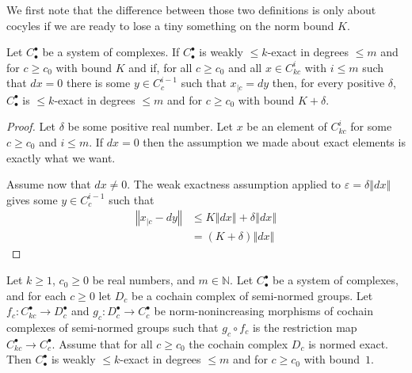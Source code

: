 We first note that the difference between those two definitions is only about
cocyles if we are ready to lose a tiny something on the norm bound $K$.

\begin{lemma}
  \label{is_bounded_exact_of_weakly}
  Let $C_\bullet^\bullet$ be a system of complexes. If $C_\bullet^\bullet$ is
  weakly $\leq k$-exact in degrees $\leq m$ and for $c\geq c_0$ with bound $K$ and if,
  for all $c\geq c_0$ and all $x\in C_{kc}^i$ with $i\leq m$ such that $dx = 0$
  there is some $y\in C_c^{i-1}$  such that
  $x_{|c} = dy$ then, for every positive $δ$,
  $C_\bullet^\bullet$ is $\leq k$-exact in degrees $\leq m$ and for $c\geq c_0$ with
  bound $K + δ$.
\end{lemma}

\begin{proof}
  \leanok
  Let $δ$ be some positive real number.
  Let $x$ be an element of $C_{kc}^i$ for some $c ≥ c_0$ and $i ≤ m$. If $dx = 0$
  then the assumption we made about exact elements is exactly what we want.

  Assume now that $dx ≠ 0$. The weak exactness assumption applied to $ε = δ‖dx‖$
  gives some $y\in C_c^{i-1}$ such that
  \begin{align*}
    ‖x_{|c} - dy‖ &≤ K‖dx‖ + δ‖dx‖ \\
                  &= (K + δ)‖dx‖
  \end{align*}
\end{proof}

\begin{lemma}
  \label{weak_exact_of_factor_exact}
  \leanok
  Let $k \ge 1$, $c_0 \ge 0$ be real numbers, and $m \in \mathbb N$.
  Let $C_\bullet^\bullet$ be a system of complexes,
  and for each $c \ge 0$ let $D_c$ be a cochain complex of semi-normed groups.
  Let $f_c \colon C^\bullet_{kc} \to D^\bullet_c$
  and $g_c \colon D^\bullet_c \to C^\bullet_c$ be
  norm-nonincreasing morphisms of cochain complexes of semi-normed groups
  such that $g_c \circ f_c$ is the restriction map $C^\bullet_{kc} \to C^\bullet_c$.
  Assume that for all $c \ge c_0$ the cochain complex $D_c$ is normed exact.
  Then $C_\bullet^\bullet$ is weakly $\le k$-exact in degrees $\le m$ and for $c \ge c_0$ with bound~$1$.
\end{lemma}

